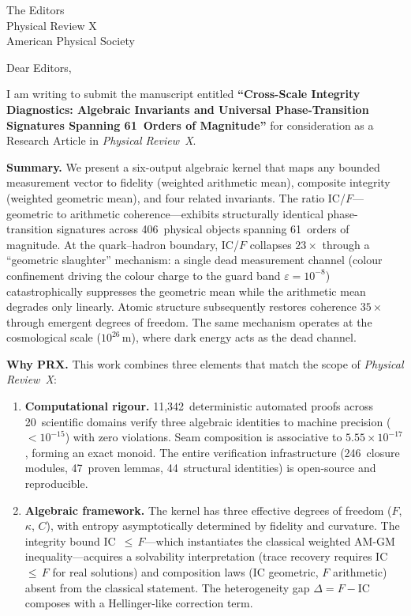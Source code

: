 \documentclass[11pt]{letter}
\begin{document}
\begin{letter}{The Editors\\Physical Review X\\American Physical Society}

\opening{Dear Editors,}

I am writing to submit the manuscript entitled \textbf{``Cross-Scale
Integrity Diagnostics: Algebraic Invariants and Universal
Phase-Transition Signatures Spanning 61~Orders of Magnitude''} for
consideration as a Research Article in \emph{Physical Review~X}.

\textbf{Summary.} We present a six-output algebraic kernel that maps
any bounded measurement vector to fidelity (weighted arithmetic
mean), composite integrity (weighted geometric mean), and four
related invariants. The ratio IC/$F$---geometric to arithmetic
coherence---exhibits structurally identical phase-transition
signatures across 406~physical objects spanning 61~orders of
magnitude. At the quark--hadron boundary, IC/$F$ collapses
$23\times$ through a ``geometric slaughter'' mechanism: a single
dead measurement channel (colour confinement driving the colour
charge to the guard band $\varepsilon = 10^{-8}$) catastrophically
suppresses the geometric mean while the arithmetic mean degrades
only linearly. Atomic structure subsequently restores coherence
$35\times$ through emergent degrees of freedom. The same mechanism
operates at the cosmological scale ($10^{26}$\,m), where dark
energy acts as the dead channel.

\textbf{Why PRX.} This work combines three elements that match
the scope of \emph{Physical Review~X}:

\begin{enumerate}
\item \textbf{Computational rigour.} 11,342~deterministic automated
  proofs across 20~scientific domains verify three algebraic
  identities to machine precision ($<10^{-15}$) with zero
  violations. Seam composition is associative to $5.55 \times
  10^{-17}$, forming an exact monoid. The entire verification
  infrastructure (246~closure modules, 47~proven lemmas, 44~structural
  identities) is open-source and reproducible.

\item \textbf{Algebraic framework.} The kernel has three effective
  degrees of freedom ($F$, $\kappa$, $C$), with entropy
  asymptotically determined by fidelity and curvature. The integrity
  bound IC~$\leq\,F$---which instantiates the classical weighted
  AM-GM inequality---acquires a solvability interpretation
  (trace recovery requires IC~$\leq\,F$ for real solutions) and
  composition laws (IC geometric, $F$ arithmetic) absent from
  the classical statement. The heterogeneity gap
  $\Delta = F - \text{IC}$ composes with a Hellinger-like
  correction term.


\end{enumerate}
\end{letter}
\end{document}
